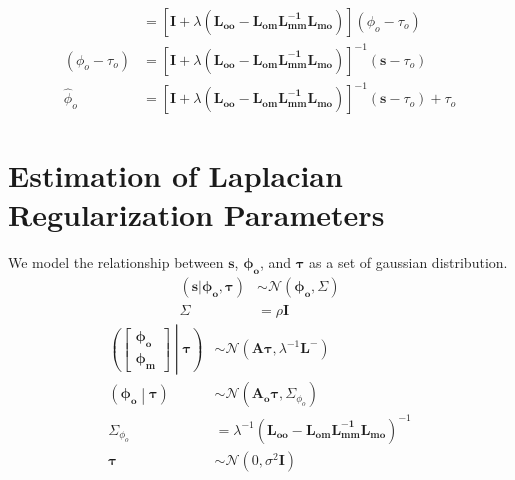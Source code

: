 \documentclass{article}
\begin{document}
\begin{align}
            &= \left[
                \mathbf{I} + \lambda\left(\mathbf{L_{oo}} -
                    \mathbf{L_{om}}\mathbf{L_{mm}^{-1}}\mathbf{L_{mo}}
                \right)
            \right](\phi_o - \tau_o) \nonumber\\
            (\phi_o - \tau_o) &= \left[
                \mathbf{I} + \lambda\left(\mathbf{L_{oo}} -
                    \mathbf{L_{om}}\mathbf{L_{mm}^{-1}}\mathbf{L_{mo}}
                \right)
            \right]^{-1}(\mathbf{s} - \tau_o) \nonumber\\
            {\hat \phi_o} &= \left[
                \mathbf{I} + \lambda\left(\mathbf{L_{oo}} -
                    \mathbf{L_{om}}\mathbf{L_{mm}^{-1}}\mathbf{L_{mo}}
                \right)
            \right]^{-1}(\mathbf{s} - \tau_o) + \tau_o
            \label{eqn:estimate_of_phi_o_complete}
        \end{align}

\section{Estimation of Laplacian Regularization Parameters}\label{sec:laplacian_regularization_parameter_estimation}
    We model the relationship between $\mathbf{s}$, $\mathbf{\phi_o}$, and
    $\mathbf{\tau}$ as a set of gaussian distribution.
    \begin{align}
        \left(\mathbf{s}|\mathbf{\phi_o}, \mathbf{\tau}\right) &\sim
            \mathcal{N}(\mathbf{\phi_o}, \Sigma)\\
        \Sigma &= \rho\mathbf{I}
    \end{align}
    \begin{align}
        \left(\begin{bmatrix}
            \mathbf{\phi_o}\\
            \mathbf{\phi_m}
        \end{bmatrix}\middle|\mathbf{\tau}\right) &\sim
            \mathcal{N}(\mathbf{A\tau}, \lambda^{-1}\mathbf{L}^-)\\
        \left(\mathbf{\phi_o}\middle|\mathbf{\tau}\right) &\sim
            \mathcal{N}\left(\mathbf{A_o}\mathbf{\tau}, \Sigma_{\phi_o}\right)\\
        \Sigma_{\phi_o} &= \lambda^{-1}\left(
            \mathbf{L_{oo}} - \mathbf{L_{om}L_{mm}^{-1}L_{mo}}\right)^{-1}\\
        \mathbf{\tau} &\sim \mathcal{N}\left(0, \sigma^2\mathbf{I}\right)
    \end{align}
\end{document}
